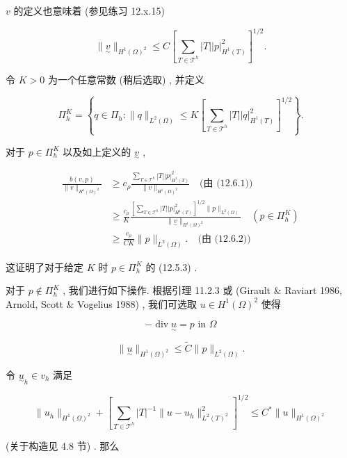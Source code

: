 $v$ 的定义也意味着 (参见练习 12.x.15)

\begin{equation}\label{eq:12.6.2}
\|\underset{\sim}{v}\|_{H^{1}(\Omega)^{2}} \leq C \left[ \sum_{T \in \mathcal{T}^{h}} |T| |p|_{H^{1}(T)}^{2} \right]^{1/2}.
\end{equation}

令 $K > 0$ 为一个任意常数 (稍后选取) , 并定义

$$
\varPi_{h}^{K} = \left\{ q \in \varPi_{h} : \|q\|_{L^{2}(\Omega)} \leq K \left[ \sum_{T \in \mathcal{T}^{h}} |T| |q|_{H^{1}(T)}^{2} \right]^{1/2} \right\}.
$$

对于 $p \in \varPi_{h}^{K}$ 以及如上定义的 $\underset{\sim}{v}$ ,

\begin{align*}
\frac{b(v,p)}{\|v\|_{H^{1}(\Omega)^{2}}} &\geq c_{\rho} \frac{\sum_{T \in \mathcal{T}^{h}} |T| |p|_{H^{1}(T)}^{2}}{\|v\|_{H^{1}(\Omega)^{2}}} \quad \text{(由 (12.6.1))} \\
&\geq \frac{c_{\rho}}{K} \frac{\left[ \sum_{T \in \mathcal{T}^{h}} |T| |p|_{H^{1}(T)}^{2} \right]^{1/2} \|p\|_{L^{2}(\Omega)}}{\|\underset{\sim}{v}\|_{H^{1}(\Omega)^{2}}} \quad (p \in \varPi_{h}^{K}) \\
&\geq \frac{c_{\rho}}{CK} \|p\|_{L^{2}(\Omega)}. \quad \text{(由 (12.6.2))}
\end{align*}

这证明了对于给定 $K$ 时 $p \in \varPi_{h}^{K}$ 的 (12.5.3) .

对于 $p \notin \varPi_{h}^{K}$ , 我们进行如下操作. 根据引理 11.2.3 或 (Girault \& Raviart 1986, Arnold, Scott \& Vogelius 1988) , 我们可选取 $u \in H^{1}(\Omega)^{2}$ 使得

$$
-\operatorname{div}\underset{\sim}{u} = p \text{ in } \Omega
$$

\begin{equation}\label{eq:12.6.3}
\|\underset{\sim}{u}\|_{H^{1}(\Omega)^{2}} \leq \widetilde{C} \|p\|_{L^{2}(\Omega)}.
\end{equation}

令 $\underset{\sim}{u}_{h} \in v_{h}$ 满足

\begin{equation}\label{eq:12.6.4}
\|u_{h}\|_{H^{1}(\Omega)^{2}} + \left[ \sum_{T \in \mathcal{T}^{h}} |T|^{-1} \|u - u_{h}\|_{L^{2}(T)^{2}}^{2} \right]^{1/2} \leq C^{*} \|u\|_{H^{1}(\Omega)^{2}}
\end{equation}

(关于构造见 4.8 节) . 那么

